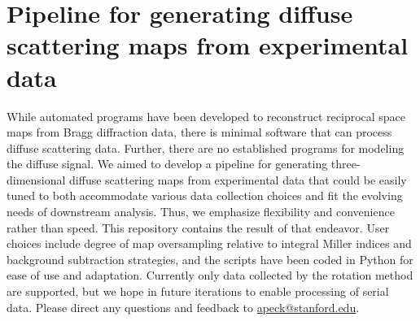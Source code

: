 \documentclass{article}
\begin{document}
\section{Pipeline for generating diffuse scattering maps from experimental data}

While automated programs have been developed to reconstruct reciprocal space maps from Bragg diffraction data, there is minimal software that can process diffuse scattering data. Further, there are no established programs for modeling the diffuse signal. We aimed to develop a pipeline for generating three-dimensional diffuse scattering maps from experimental data that could be easily tuned to both accommodate various data collection choices and fit the evolving needs of downstream analysis. Thus, we emphasize flexibility and convenience rather than speed. This repository contains the result of that endeavor. User choices include degree of map oversampling relative to integral Miller indices and background subtraction strategies, and the scripts have been coded in Python for ease of use and adaptation. Currently only data collected by the rotation method are supported, but we hope in future iterations to enable processing of serial data. Please direct any questions and feedback to \url{apeck@stanford.edu}.
\end{document}

